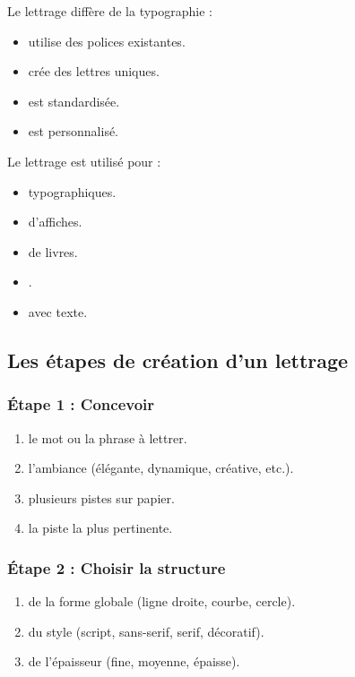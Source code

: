 Le lettrage diffère de la typographie :

\begin{itemize}
    \item {} utilise des polices existantes.
    \item {} crée des lettres uniques.
    \item {} est standardisée.
    \item {} est personnalisé.
\end{itemize}

Le lettrage est utilisé pour :

\begin{itemize}
    \item {} typographiques.
    \item {} d'affiches.
    \item {} de livres.
    \item {}.
    \item {} avec texte.
\end{itemize}

\subsection{Les étapes de création d'un lettrage}

\subsubsection{Étape 1 : Concevoir}

\begin{enumerate}
    \item {} le mot ou la phrase à lettrer.
    \item {} l'ambiance (élégante, dynamique, créative, etc.).
    \item {} plusieurs pistes sur papier.
    \item {} la piste la plus pertinente.
\end{enumerate}

\subsubsection{Étape 2 : Choisir la structure}

\begin{enumerate}
    \item {} de la forme globale (ligne droite, courbe, cercle).
    \item {} du style (script, sans-serif, serif, décoratif).
    \item {} de l'épaisseur (fine, moyenne, épaisse).
\end{enumerate}

